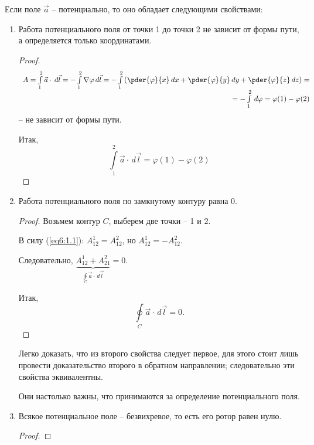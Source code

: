 	Если поле \( \vec{a} \) -- потенциально, то оно обладает следующими свойствами:
	\begin{enumerate}
	\item Работа потенциального поля от точки 1 до точки 2 не зависит от формы пути, а определяется только координатами.
	
	\begin{proof}
	\[ \begin{array}{r}
	A = \int\limits_1^2 \vec{a}\cdot\,d\vec{l} = -\int\limits_1^2 \nabla\varphi\,d\vec{l} = -\int\limits_1^2 \left(\pder{\varphi}{x}\,d x + \pder{\varphi}{y}\,d y + \pder{\varphi}{z}\,d z\right) = \\
	= -\int\limits_1^2 \,d\varphi = \varphi(1)-\varphi(2) \end{array} \]
	-- не зависит от формы пути.
	
	Итак,
	\begin{equation}
		\int\limits_1^2 \vec{a}\cdot\,d\vec{l} = \varphi(1) - \varphi(2) \label{eq6:1.1}
	\end{equation}
	\end{proof}
	
	\item Работа потенциального поля по замкнутому контуру равна 0.
	
	\begin{proof}
	
	Возьмем контур \( C \), выберем две точки -- 1 и 2.
	
	В силу (\ref{eq6:1.1}): \( A_{12}^1 = A_{12}^2 \), но \( A_{12}^1 = -A_{12}^2 \).

	Следовательно, \( \underbrace{A_{12}^1 + A_{21}^2}_{\oint\limits_C \vec{a}\cdot\,d\vec{l}} = 0 \).
	
	Итак,
	\begin{equation}
		\oint\limits_C \vec{a}\cdot\,d\vec{l} = 0. \label{eq6:1.2}
	\end{equation}
	\end{proof}
	
	\begin{remark}
	Легко доказать, что из второго свойства следует первое, для этого стоит лишь провести доказательство второго в обратном направлении; следовательно эти свойства эквивалентны.
	
	Они настолько важны, что принимаются за определение потенциального поля.
	\end{remark}
	
	\item Всякое потенциальное поле -- безвихревое, то есть его ротор равен нулю.
	\begin{proof}
	

\end{proof}
\end{enumerate}
